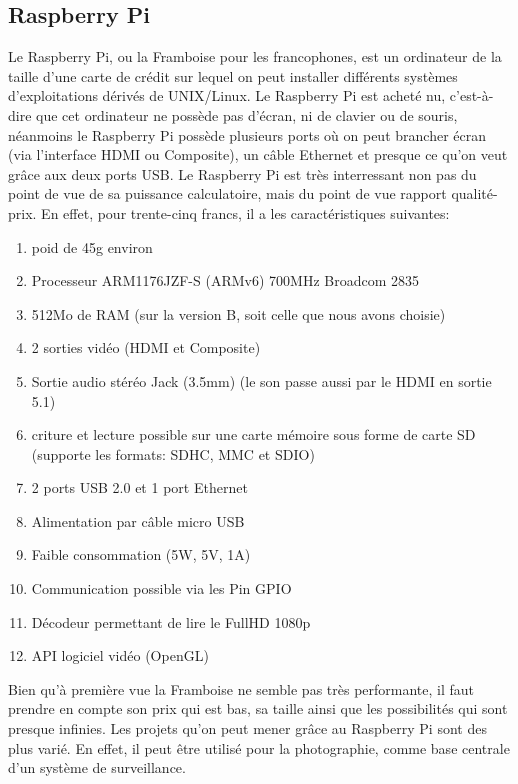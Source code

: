 \documentclass[a4paper,11pt]{report}
\begin{document}
{\subsection{Raspberry Pi}
Le Raspberry Pi\cite{RaspberryPiCaracteristiques}, ou la Framboise pour les francophones, est un ordinateur de la taille d'une carte de crédit sur lequel on peut installer différents systèmes d'exploitations dérivés de UNIX/Linux. Le Raspberry Pi est acheté nu, c'est-à-dire que cet ordinateur ne possède pas d'écran, ni de clavier ou de souris, néanmoins le Raspberry Pi possède plusieurs ports où on peut brancher écran (via l'interface HDMI ou Composite), un câble Ethernet et presque ce qu'on veut grâce aux deux ports USB. Le Raspberry Pi est très interressant non pas du point de vue de sa puissance calculatoire, mais du point de vue rapport qualité-prix. En effet, pour trente-cinq francs, il a les caractéristiques suivantes: 
\begin{enumerate}
\item poid de 45g environ
\item Processeur ARM1176JZF-S (ARMv6) 700MHz Broadcom 2835
\item 512Mo de RAM (sur la version B, soit celle que nous avons choisie)
\item 2 sorties vidéo (HDMI et Composite) 
\item Sortie audio stéréo Jack (3.5mm) (le son passe aussi par le HDMI en sortie 5.1)
\item criture et lecture possible sur une carte mémoire sous forme de carte SD (supporte les formats: SDHC, MMC et SDIO)
\item 2 ports USB 2.0 et 1 port Ethernet
\item Alimentation par câble micro USB
\item Faible consommation (5W, 5V, 1A)
\item Communication possible via les Pin GPIO
\item Décodeur permettant de lire le FullHD  1080p
\item API logiciel vidéo (OpenGL)
\end{enumerate}
Bien qu'à première vue la Framboise ne semble pas très performante, il faut prendre en compte son prix qui est bas, sa taille ainsi que les possibilités qui sont presque infinies. Les projets qu'on peut mener grâce au Raspberry Pi sont des plus varié. En effet, il peut être utilisé pour la photographie, comme base centrale d'un système de surveillance. 

}
\end{document}
